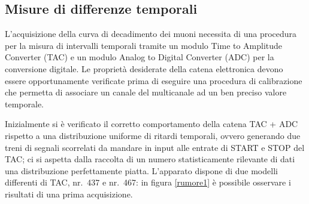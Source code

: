 \documentclass[10pt, oneside, a4paper]{article}   	%
\begin{document}
%
\subsection{Misure di differenze temporali}
L'acquisizione della curva di decadimento dei muoni necessita di una procedura per la misura di intervalli temporali tramite un modulo Time to Amplitude Converter (TAC) e un modulo Analog to Digital Converter (ADC) per la conversione digitale. Le proprietà desiderate della catena elettronica devono essere opportunamente verificate prima di eseguire una procedura di calibrazione che permetta di associare un canale del multicanale ad un ben preciso valore temporale.

Inizialmente si è verificato il corretto comportamento della catena TAC + ADC rispetto a una distribuzione uniforme di ritardi temporali, ovvero generando due treni di segnali scorrelati da mandare in input alle entrate di START e STOP del TAC; ci si aspetta dalla raccolta di un numero statisticamente rilevante di dati una distribuzione perfettamente piatta. L'apparato dispone di due modelli differenti di TAC, nr.~437 e nr.~467: in figura \ref{rumore1} è possibile osservare i risultati di una prima acquisizione.
%
\end{document}
